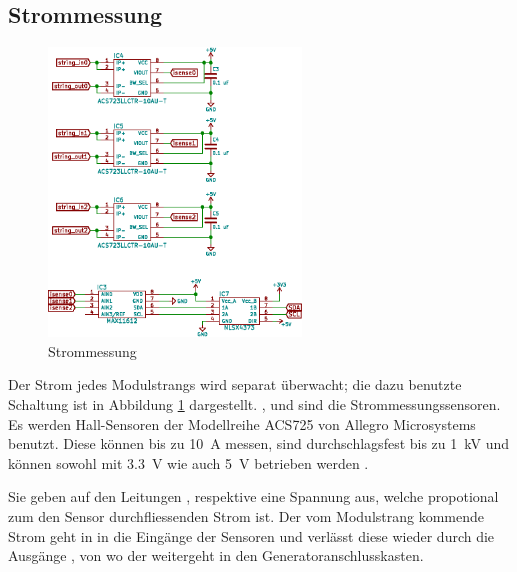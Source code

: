 \clearpage
\subsection{Strommessung}
\label{subsec:hw:master:current}


\begin{figure}[h!t]
    \centering
    \includegraphics[width=0.60\textwidth]{images/superv-sch/supervisor--sch--current.eps}
    \caption[\Master: Schema Strommessung]{Strommessung}
    \label{fig:sch:master:current}
\end{figure}


Der  Strom jedes  Modulstrangs  wird separat  \"uberwacht;  die dazu  benutzte
Schaltung   ist   in   Abbildung   \ref{fig:sch:master:current}   dargestellt.
,    und    sind  die  Strommessungssensoren. Es
werden  Hall-Sensoren   der  Modellreihe   ACS725  von   Allegro  Microsystems
benutzt. Diese k\"onnen bis zu  \SI{10}{\ampere} messen, sind durchschlagsfest
bis zu  \SI{1}{\kilo\volt} und  k\"onnen sowohl  mit \SI{3.3}{\volt}  wie auch
\SI{5}{\volt} betrieben werden \cite{datasheet:hallic}.

Sie  geben   auf  den  Leitungen  ,     respektive
  eine   Spannung  aus,   welche  propotional  zum   den  Sensor
durchfliessenden Strom ist. Der vom Modulstrang  kommende Strom geht in in die
Eing\"ange  der Sensoren und verl\"asst diese wieder
durch die Ausg\"ange , von wo der weitergeht in den
Generatoranschlusskasten.

